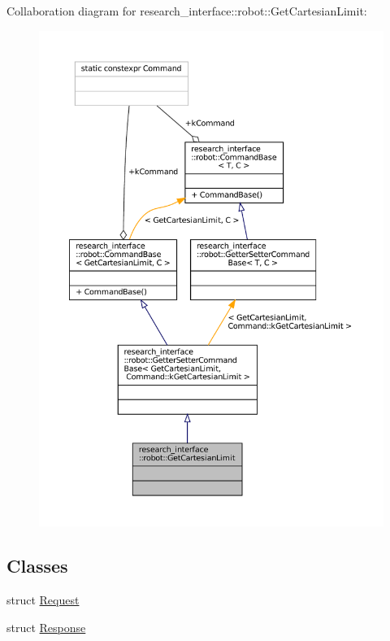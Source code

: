 Collaboration diagram for research\+\_\+interface\+:\+:robot\+:\+:Get\+Cartesian\+Limit\+:
\nopagebreak
\begin{figure}[H]
\begin{center}
\leavevmode
\includegraphics[width=350pt]{structresearch__interface_1_1robot_1_1GetCartesianLimit__coll__graph}
\end{center}
\end{figure}
\subsection*{Classes}
\begin{DoxyCompactItemize}
\item 
struct \hyperlink{structresearch__interface_1_1robot_1_1GetCartesianLimit_1_1Request}{Request}
\item 
struct \hyperlink{structresearch__interface_1_1robot_1_1GetCartesianLimit_1_1Response}{Response}
\end{DoxyCompactItemize}
